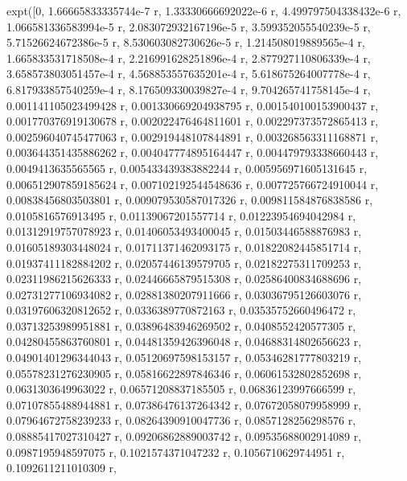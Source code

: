 \documentclass[a4paper,10pt]{article}
\begin{document}
\begin{eulernotebook}
\begin{eulercomment}
\begin{eulercomment}
\begin{eulercomment}
\begin{eulercomment}
\begin{eulercomment}
\begin{eulercomment}
\begin{eulercomment}
\begin{eulercomment}
\begin{eulercomment}
\begin{eulercomment}
\begin{eulercomment}
\begin{eulercomment}
\begin{eulercomment}
\begin{eulercomment}
\begin{eulercomment}
\begin{eulercomment}
\begin{eulercomment}
\begin{eulercomment}
\begin{eulercomment}
\begin{eulercomment}
\begin{eulercomment}
\begin{eulercomment}
\begin{eulercomment}
\begin{eulercomment}
\begin{eulercomment}
\begin{eulercomment}
\begin{eulercomment}
\begin{eulercomment}
\begin{euleroutput}
          expt([0, 1.66665833335744e-7 r, 1.33330666692022e-6 r, 
  4.499797504338432e-6 r, 1.066581336583994e-5 r, 
  2.083072932167196e-5 r, 3.599352055540239e-5 r, 
  5.71526624672386e-5 r, 8.530603082730626e-5 r, 
  1.214508019889565e-4 r, 1.665833531718508e-4 r, 
  2.216991628251896e-4 r, 2.877927110806339e-4 r, 
  3.658573803051457e-4 r, 4.568853557635201e-4 r, 
  5.618675264007778e-4 r, 6.817933857540259e-4 r, 
  8.176509330039827e-4 r, 9.704265741758145e-4 r, 
  0.001141105023499428 r, 0.001330669204938795 r, 
  0.001540100153900437 r, 0.001770376919130678 r, 
  0.002022476464811601 r, 0.002297373572865413 r, 
  0.002596040745477063 r, 0.002919448107844891 r, 
  0.003268563311168871 r, 0.003644351435886262 r, 
  0.004047774895164447 r, 0.004479793338660443 r, 0.0049413635565565 r, 
  0.005433439383882244 r, 0.005956971605131645 r, 
  0.006512907859185624 r, 0.007102192544548636 r, 
  0.007725766724910044 r, 0.00838456803503801 r, 
  0.009079530587017326 r, 0.009811584876838586 r, 0.0105816576913495 r, 
  0.01139067201557714 r, 0.01223954694042984 r, 0.01312919757078923 r, 
  0.01406053493400045 r, 0.01503446588876983 r, 0.01605189303448024 r, 
  0.01711371462093175 r, 0.01822082445851714 r, 0.01937411182884202 r, 
  0.02057446139579705 r, 0.02182275311709253 r, 0.02311986215626333 r, 
  0.02446665879515308 r, 0.02586400834688696 r, 0.02731277106934082 r, 
  0.02881380207911666 r, 0.03036795126603076 r, 0.03197606320812652 r, 
  0.0336389770872163 r, 0.03535752660496472 r, 0.03713253989951881 r, 
  0.03896483946269502 r, 0.0408552420577305 r, 0.04280455863760801 r, 
  0.04481359426396048 r, 0.04688314802656623 r, 0.04901401296344043 r, 
  0.05120697598153157 r, 0.05346281777803219 r, 0.05578231276230905 r, 
  0.05816622897846346 r, 0.06061532802852698 r, 0.0631303649963022 r, 
  0.06571208837185505 r, 0.06836123997666599 r, 0.07107855488944881 r, 
  0.07386476137264342 r, 0.07672058079958999 r, 0.07964672758239233 r, 
  0.08264390910047736 r, 0.0857128256298576 r, 0.08885417027310427 r, 
  0.09206862889003742 r, 0.09535688002914089 r, 0.0987195948597075 r, 
  0.1021574371047232 r, 0.1056710629744951 r, 0.1092611211010309 r, 

\end{euleroutput}
\end{eulercomment}
\end{eulercomment}
\end{eulercomment}
\end{eulercomment}
\end{eulercomment}
\end{eulercomment}
\end{eulercomment}
\end{eulercomment}
\end{eulercomment}
\end{eulercomment}
\end{eulercomment}
\end{eulercomment}
\end{eulercomment}
\end{eulercomment}
\end{eulercomment}
\end{eulercomment}
\end{eulercomment}
\end{eulercomment}
\end{eulercomment}
\end{eulercomment}
\end{eulercomment}
\end{eulercomment}
\end{eulercomment}
\end{eulercomment}
\end{eulercomment}
\end{eulercomment}
\end{eulercomment}
\end{eulercomment}
\end{eulernotebook}
\end{document}
